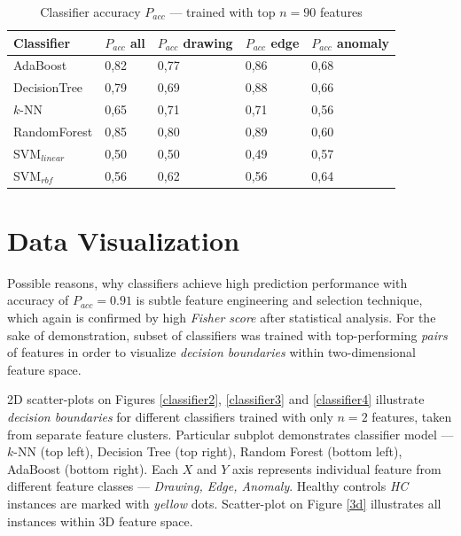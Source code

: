 \begin{table}[htb]
    \centering
    \begin{tabular}{l|C{2.5cm}|C{2.5cm}|C{2.5cm}|C{2.5cm}}
    \toprule
    Classifier & $P_{acc}$ all & $P_{acc}$ drawing & $P_{acc}$ edge & $P_{acc}$ anomaly \\
    \midrule
    AdaBoost & 0,82 & 0,77 & 0,86 & 0,68 \\
    DecisionTree & 0,79 & 0,69 & 0,88 & 0,66 \\
    $k$-NN & 0,65 & 0,71 & 0,71 & 0,56 \\
    RandomForest & 0,85 & 0,80 & 0,89 & 0,60 \\
    SVM$_{linear}$ & 0,50 & 0,50 & 0,49 & 0,57 \\
    SVM$_{rbf}$ & 0,56 & 0,62 & 0,56 & 0,64 \\
    \bottomrule
    \end{tabular}
    \caption{Classifier accuracy $P_{acc}$ --- trained with top $n=90$ features}
    \label{acc-3}
\end{table}

\section{Data Visualization}

Possible reasons, why classifiers achieve high prediction performance with accuracy of $P_{acc} = 0.91$ is subtle feature engineering and selection technique, which again is confirmed by high \textit{Fisher score} after statistical analysis. For the sake of demonstration, subset of classifiers was trained with top-performing \textit{pairs} of features in order to visualize \textit{decision boundaries} within two-dimensional feature space.

2D scatter-plots on Figures \ref{classifier2}, \ref{classifier3} and \ref{classifier4} illustrate \textit{decision boundaries} for different classifiers trained with only $n=2$ features, taken from separate feature clusters. Particular subplot demonstrates classifier model --- $k$-NN (top left), Decision Tree (top right), Random Forest (bottom left), AdaBoost (bottom right).  Each $X$ and $Y$ axis represents individual feature from different feature classes --- \textit{Drawing, Edge, Anomaly}. Healthy controls \textit{HC} instances are marked with \textit{yellow} dots. Scatter-plot on Figure \ref{3d} illustrates all instances within 3D feature space.

